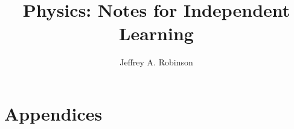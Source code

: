 \documentclass[oneside]{book}
\title{Physics: Notes for Independent Learning}
\author{Jeffrey A. Robinson}
\theoremstyle{definition}
\begin{document}
\frontmatter

\maketitle
\tableofcontents

\mainmatter


\backmatter

\appendix 
\part{Appendices}



\printindex
\end{document}
